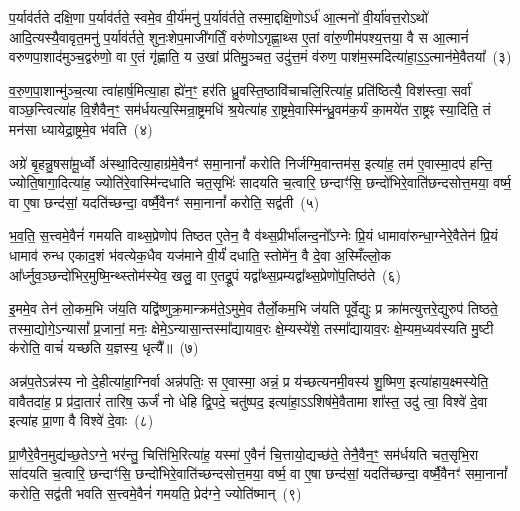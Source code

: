 प॒र्याव॑र्तते दक्षि॒णा प॒र्याव॑र्तते॒ स्वमे॒व वी॒र्य॑मनु॑ प॒र्याव॑र्तते॒ तस्मा॒द्दक्षि॒णो\-ऽर्ध॑ आ॒त्मनो॑ वी॒र्या॑वत्त॒रो\-ऽथो॑ आदि॒त्यस्यै॒वावृत॒मनु॑ प॒र्याव॑र्तते॒ शुनः॒शेप॒माजी॑गर्तिं॒ वरु॑णो\-ऽगृह्णा॒थ्स ए॒तां वा॑रु॒णीम॑पश्य॒त्तया॒ वै स आ॒त्मानं॑ वरुणपा॒शाद॑मुञ्च॒द्वरु॑णो॒ वा ए॒तं गृ॑ह्णाति॒ य उ॒खां प्र॑तिमु॒ञ्चत॒ उदु॑त्त॒मं व॑रुण॒ पाश॑म॒स्मदित्या॑हा॒\-ऽ॒\-ऽ॒त्मान॑मे॒वैतया᳚~(३)

व॒रु॒ण॒पा॒शान्मु॑ञ्च॒त्या त्वा॑हार्\mbox{}ष॒मित्या॒हा ह्ये॑न॒ꣳ॒ हर॑ति ध्रु॒वस्ति॒ष्ठावि॑चाचलि॒रित्या॑ह॒ प्रति॑ष्ठित्यै॒ विश॑स्त्वा॒ सर्वा॑ वाञ्छ॒न्त्वित्या॑ह वि॒शैवैन॒ꣳ॒ सम॑र्धयत्य॒स्मिन्रा॒ष्ट्रमधि॑ श्र॒येत्या॑ह रा॒ष्ट्रमे॒वास्मि॑न्ध्रु॒वम॑क॒र्यं का॒मये॑त रा॒ष्ट्रꣴ स्या॒दिति॒ तं मन॑सा ध्यायेद्रा॒ष्ट्रमे॒व भ॑वति~(४)

अग्रे॑ बृ॒हन्नु॒षसा॑मू॒र्ध्वो अ॑स्था॒दित्या॒हाग्र॑मे॒वैनꣳ॑ समा॒नानां᳚ करोति निर्जग्मि॒वान्तम॑स॒ इत्या॑ह॒ तम॑ ए॒वास्मा॒दप॑ हन्ति॒ ज्योति॒षागा॒दित्या॑ह॒ ज्योति॑रे॒वास्मि॑न्दधाति चत॒सृभिः॑ सादयति च॒त्वारि॒ छन्दाꣳ॑सि॒ छन्दो॑भिरे॒वाति॑छन्दसोत्त॒मया॒ वर्ष्म॒ वा ए॒षा छन्द॑सां॒ यदति॑च्छन्दा॒ वर्ष्मै॒वैनꣳ॑ समा॒नानां᳚ करोति॒ सद्व॑ती~(५)

भ॒व॒ति॒ स॒त्त्वमे॒वैनं॑ गमयति वाथ्स॒प्रेणोप॑ तिष्ठत ए॒तेन॒ वै व॑थ्स॒प्रीर्भा॑लन्द॒नो᳚\-ऽग्नेः प्रि॒यं धामावा॑रुन्धा॒ग्नेरे॒वैतेन॑ प्रि॒यं धामाव॑ रुन्ध एकाद॒शं भ॑वत्येक॒धैव यज॑माने वी॒र्यं॑ दधाति॒ स्तोमे॑न॒ वै दे॒वा अ॒स्मिँल्लो॒क आ᳚र्ध्नुव॒ञ्छन्दो॑भिर॒मुष्मि॒न्थ्स्तोम॑स्येव॒ खलु॒ वा ए॒तद्रू॒पं यद्वा᳚थ्स॒प्रम्यद्वा᳚थ्स॒प्रेणो॑प॒तिष्ठ॑ते~(६)

इ॒ममे॒व तेन॑ लो॒कम॒भि ज॑य॒ति यद्वि॑ष्णुक्र॒मान्क्रम॑ते॒\-ऽमुमे॒व तैर्लो॒कम॒भि ज॑यति पूर्वे॒द्युः प्र क्रा॑मत्युत्तरे॒द्युरुप॑ तिष्ठते॒ तस्मा॒द्योगे॒\-ऽन्यासां᳚ प्र॒जानां॒ मनः॒ क्षेमे॒\-ऽन्यासा॒न्तस्मा᳚द्यायाव॒रः क्षे॒म्यस्ये॑शे॒ तस्मा᳚द्यायाव॒रः क्षे॒म्यम॒ध्यव॑स्यति मु॒ष्टी क॑रोति॒ वाचं॑ यच्छति य॒ज्ञस्य॒ धृत्यै᳚॥~(७)

{}%

अन्न॑प॒ते\-ऽन्न॑स्य नो दे॒हीत्या॑हा॒ग्निर्वा अन्न॑पतिः॒ स ए॒वास्मा॒ अन्नं॒ प्र य॑च्छत्यनमी॒वस्य॑ शु॒ष्मिण॒ इत्या॑हाय॒क्ष्मस्येति॒ वावैतदा॑ह॒ प्र प्र॑दा॒तारं॑ तारिष॒ ऊर्जं॑ नो धेहि द्वि॒पदे॒ चतु॑ष्पद॒ इत्या॑हा॒\-ऽऽ\-शिष॑मे॒वैतामा शा᳚स्त॒ उदु॑ त्वा॒ विश्वे॑ दे॒वा इत्या॑ह प्रा॒णा वै विश्वे॑ दे॒वाः~(८)

प्रा॒णैरे॒वैन॒मुद्य॑च्छ॒ते\-ऽग्ने॒ भर॑न्तु॒ चित्ति॑भि॒रित्या॑ह॒ यस्मा॑ ए॒वैनं॑ चि॒त्तायो॒द्यच्छ॑ते॒ तेनै॒वैन॒ꣳ॒ सम॑र्धयति चत॒सृभि॒रा सा॑दयति च॒त्वारि॒ छन्दाꣳ॑सि॒ छन्दो॑भिरे॒वाति॑च्छन्दसोत्त॒मया॒ वर्ष्म॒ वा ए॒षा छन्द॑सां॒ यदति॑च्छन्दा॒ वर्ष्मै॒वैनꣳ॑ समा॒नानां᳚ करोति॒ सद्व॑ती भवति स॒त्त्वमे॒वैनं॑ गमयति॒ प्रेद॑ग्ने॒ ज्योति॑ष्मान्~(९)

